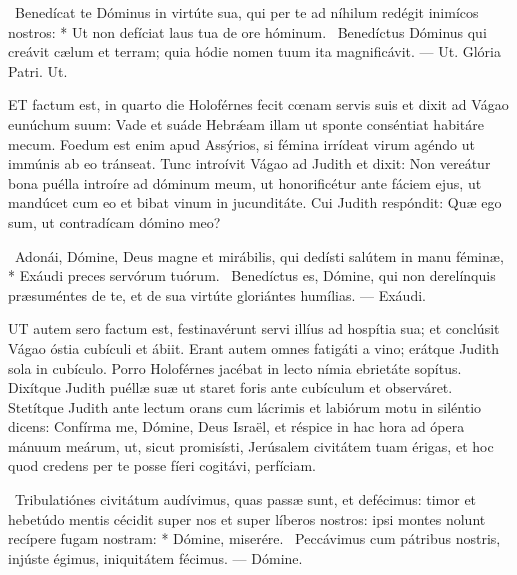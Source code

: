 \R\ Benedícat te Dóminus in virtúte sua, qui per te ad níhilum redégit inimícos nostros: * Ut non defíciat laus tua de ore hóminum. \V\ Benedíctus Dóminus qui creávit cælum et terram; quia hódie nomen tuum ita magnificávit. — Ut. Glória Patri. Ut.





\lettrine[lines=2]{E}{T} factum est, in quarto die Holoférnes fecit cœnam servis suis et dixit ad Vágao eunúchum suum: Vade et suáde Hebrǽam illam ut sponte conséntiat habitáre mecum. Foedum est enim apud Assýrios, si fémina irrídeat virum agéndo ut immúnis ab eo tránseat. Tunc introívit Vágao ad Judith et dixit: Non vereátur bona puélla introíre ad dóminum meum, ut honorificétur ante fáciem ejus, ut mandúcet cum eo et bibat vinum in jucunditáte. Cui Judith respóndit: Quæ ego sum, ut contradícam dómino meo?

\R\ Adonái, Dómine, Deus magne et mirábilis, qui dedísti salútem in manu féminæ, * Exáudi preces servórum tuórum. \V\ Benedíctus es, Dómine, qui non derelínquis præsuméntes de te, et de sua virtúte gloriántes humílias. — Exáudi.


\lettrine[lines=2]{U}{T} autem sero factum est, festinavérunt servi illíus ad hospítia sua; et conclúsit Vágao óstia cubículi et ábiit. Erant autem omnes fatigáti a vino; erátque Judith sola in cubículo. Porro Holoférnes jacébat in lecto nímia ebrietáte sopítus. Dixítque Judith puéllæ suæ ut staret foris ante cubículum et observáret. Stetítque Judith ante lectum orans cum lácrimis et labiórum motu in siléntio dicens: Confírma me, Dómine, Deus Israël, et réspice in hac hora ad ópera mánuum meárum, ut, sicut promisísti, Jerúsalem civitátem tuam érigas, et hoc quod credens per te posse fíeri cogitávi, perfíciam.

\R\ Tribulatiónes civitátum audívimus, quas passæ sunt, et defécimus: timor et hebetúdo mentis cécidit super nos et super líberos nostros: ipsi montes nolunt recípere fugam nostram: * Dómine, miserére. \V\ Peccávimus cum pátribus nostris, injúste égimus, iniquitátem fécimus. — Dómine.

